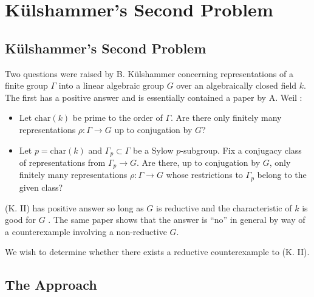 
\chapter{K\"ulshammer's Second Problem}
\label{Chapter4}


\section{K\"ulshammer's Second Problem}

Two questions were raised by B. K\"ulshammer concerning representations of a finite group $\Gamma$ into a linear algebraic group $G$ over an algebraically closed field $k$. The first has a positive answer  and is essentially contained a paper by A. Weil \cite{weil1964remarks}:
\begin{itemize}
	\item[(K. I)] Let $\mathrm{char}(k)$ be prime to the order of $\Gamma$. Are there only finitely many representations $\rho:\Gamma\rightarrow G$ up to conjugation by $G$?
	\item[(K. II)] Let $p = \mathrm{char}(k)$ and $\Gamma_p \subset  \Gamma$ be a Sylow $p$-subgroup. Fix a conjugacy class of representations from $\Gamma_p\rightarrow G$. Are there, up to conjugation by $G$, only finitely many representations $\rho:\Gamma\rightarrow G$ whose restrictions to $\Gamma_p$ belong to the given class?
\end{itemize}

(K. II) has positive answer so long as $G$ is reductive and the characteristic of $k$ is good for $G$ \cite{slodowy1997two}. The same paper shows that the answer is ``no'' in general by way of a counterexample involving a non-reductive $G$.

We wish to determine whether there exists a reductive counterexample to (K. II).

\section{The Approach}

